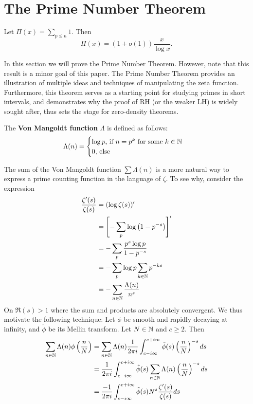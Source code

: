 \section{The Prime Number Theorem}

\begin{theorem}
    Let $\Pi(x)=\sum_{p\leq n} 1$. Then \[
        \Pi(x) = (1+o(1))\frac{x}{\log x}.
    \]
\end{theorem}

In this section we will prove the Prime Number Theorem.
However, note that this result is a minor goal of this paper.
The Prime Number Theorem provides an illustration of multiple ideas
and techniques of manipulating the zeta function.
Furthermore, this theorem serves as a starting point for
studying primes in short intervals, and demonstrates why the proof of
RH (or the weaker LH) is widely sought after, thus sets the stage for zero-density theorems.
\begin{definition}
    The \textbf{Von Mangoldt function} $\Lambda$ is defined as follows:
    \[
        \Lambda(n) = \begin{cases}
            \log p \textrm{, if $n = p^k$ for some $k\in\mathbb{N}$}\\
            0 \textrm{, else}
        \end{cases}
    \]
\end{definition}
The sum of the Von Mangoldt function $\sum\Lambda (n)$ is a more natural way to express
a prime counting function in the language of $\zeta$. To see why, consider the expression
\begin{align*}
    \frac{\zeta '(s)}{\zeta(s)} &= (\log\zeta(s))'\\
    &= \left[ -\sum_{p} \log\left(1-p^{-s}\right)\right]^{\prime}\\
    &= - \sum_{p} \frac{p^s \log p }{1-p^{-s}}\\
    &= -\sum_{p} \log p \sum_{k\in\mathbb{N}} p^{-ks}\\
    &= - \sum_{n\in\mathbb{N}} \frac{\Lambda(n)}{n^s}
\end{align*}
On $\Re(s)>1$ where the sum and products are absolutely convergent. We thus motivate the following technique:
Let $\phi$ be smooth and rapidly decaying at infinity, and $\tilde{\phi}$ be its Mellin transform. Let $N\in\mathbb{N}$ and $c\geq 2$. Then \begin{equation} \label{mellinonzeta}
    \begin{split}
    \sum_{n\in\mathbb{N}} \Lambda(n) \phi\left(\frac{n}{N}\right) &=
    \sum_{n\in\mathbb{N}} \Lambda(n) \frac{1}{2\pi i}\int_{c-i\infty}^{c+i\infty}
    \tilde{\phi}(s)\left(\frac{n}{N}\right)^{-s} ds \\
    &= \frac{1}{2\pi i}\int_{c-i\infty}^{c+i\infty}
    \tilde{\phi}(s)\sum_{n\in\mathbb{N}} \Lambda(n) \left(\frac{n}{N}\right)^{-s} ds \\
    &= \frac{-1}{2\pi i}\int_{c-i\infty}^{c+i\infty}
    \tilde{\phi}(s) N^s \frac{\zeta'(s)}{\zeta(s)} ds \\
    \end{split}
\end{equation}
